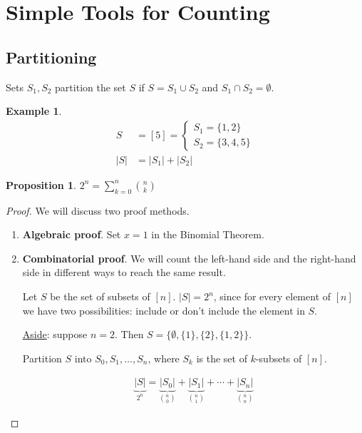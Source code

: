 \documentclass[]{article}
\newtheorem{proposition}{Proposition}[section]
\theoremstyle{definition}
\newtheorem{ex}{Example}[section]
\newcommand{\union}{\cup}
\newcommand{\intersection}{\cap}
\begin{document}
		\section{Simple Tools for Counting}
			\subsection{Partitioning}
				Sets $S_1, S_2$ partition the set $S$ if $S = S_1 \union S_2$ and $S_1 \intersection S_2 = \emptyset$.
				
				\begin{ex}
					\begin{align*}
						S &= [5] = \begin{cases} 
							S_1 = \{1, 2 \} \\
							S_2 = \{3, 4, 5\}
						\end{cases} \\
						|S| &= |S_1| + |S_2|
					\end{align*}
				\end{ex}
				
				\begin{proposition}
					$\displaystyle 2^n = \sum_{k = 0}^{n} {n \choose k}$
				\end{proposition}
				
				\begin{proof}
					We will discuss two proof methods.
					
					\begin{enumerate}
						\item \textbf{Algebraic proof}. Set $x = 1$ in the Binomial Theorem.
						\item \textbf{Combinatorial proof}. We will count the left-hand side and the right-hand side in different ways to reach the same result.
						
						Let $S$ be the set of subsets of $[n]$. $|S| = 2^n$, since for every element of $[n]$ we have two possibilities: include or don't include the element in $S$.
						
						\underline{Aside}: suppose $n = 2$. Then $S = \{\emptyset, \{1\}, \{2\}, \{1, 2\}\}$. 
						
						Partition $S$ into $S_0, S_1, \ldots, S_n$, where $S_k$ is the set of $k$-subsets of $[n]$.
						
						\begin{align*}
							\underbrace{|S|}_{2^n} = \underbrace{|S_0|}_{{n \choose 0}} + \underbrace{|S_1|}_{n \choose 1} + \cdots + \underbrace{|S_n|}_{n \choose n}
						\end{align*}
					\end{enumerate}
				\end{proof}
				
\end{document}
